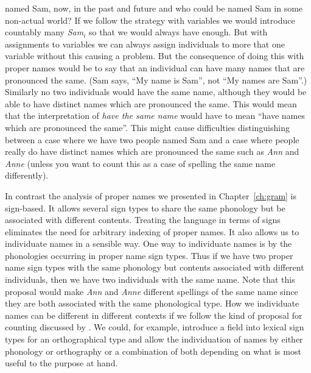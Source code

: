 named Sam, now, in the past and future and who could be named Sam in
some non-actual world?  If we follow the strategy with variables we
would introduce countably many \textit{Sam}$_i$ so that we would
always have enough.  But with assignments to variables we can always
assign individuals to more that one variable without this causing a
problem.  But the consequence of doing this with proper names would be
to say that an individual can have many names that are pronounced the
same.  (Sam says, ``My name is Sam'', not ``My names are Sam''.) Similarly no two individuals would have the same name, although
they would be able to have distinct names which are pronounced the
same.  This would mean that the interpretation of \textit{have the
  same name} would have to mean ``have names which are pronounced the
same''.  This might cause difficulties distinguishing between a case
where we have two people named Sam and a case where people really do
have distinct names which are pronounced the same such as \textit{Ann}
and \textit{Anne} (unless you want to count this as a case of spelling
the same name differently).

In contrast the analysis of proper names we presented in
Chapter~\ref{ch:gram} is sign-based.  It allows several sign types to
share the same phonology but be associated with different contents.
Treating the language in terms of signs eliminates the need for
arbitrary indexing of proper names.  It also allows us to individuate
names in a sensible way.  One way to individuate names is by the
phonologies occurring in proper name sign types.  Thus if we have two
proper name sign types with the same phonology but contents associated
with different individuals, then we have two individuals with the same
name.  Note that this proposal would make \textit{Ann} and
\textit{Anne} different spellings of the same name since they are both
associated with the same phonological type.  How we individuate names
can be different in different contexts if we follow the kind of
proposal for counting discussed by \cite{Cooper2011}.  We could, for
example, introduce a field into lexical sign types for an
orthographical type and allow the individuation of names by either
phonology or orthography or a combination of both depending on what is
most useful to the purpose at hand.

